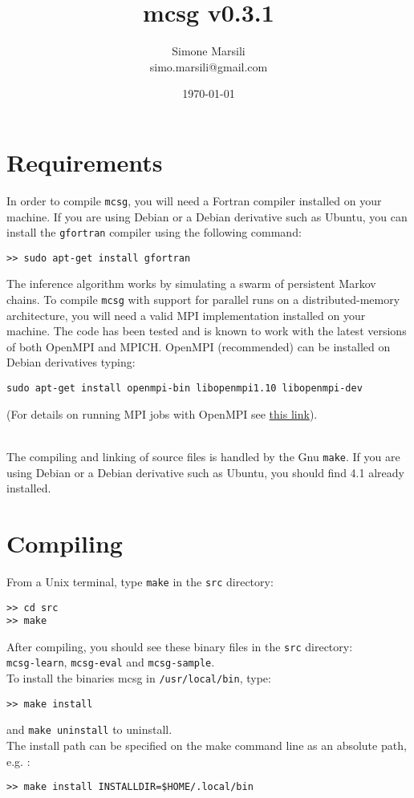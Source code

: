 \documentclass[a4paper,onecolumn]{article}
\title{mcsg v0.3.1}
\author{
        Simone Marsili \\
        simo.marsili@gmail.com
}
\date{\today}
\begin{document}
\maketitle

\section{Requirements}
\label{sec:requirements}

In order to compile \verb|mcsg|, you will need a Fortran compiler installed on your machine.   
If you are using Debian or a Debian derivative such as Ubuntu, you can install the \verb|gfortran| compiler using the following command:
\begin{verbatim}
>> sudo apt-get install gfortran
\end{verbatim}

The inference algorithm works by simulating a swarm of persistent Markov chains. 
To compile \verb|mcsg| with support for parallel runs on a distributed-memory architecture,
you will need a valid MPI implementation installed on your machine. 
The code has been tested and is known to work with the latest versions of both OpenMPI and MPICH.   
OpenMPI (recommended) can be installed on Debian derivatives typing:
\begin{verbatim}
sudo apt-get install openmpi-bin libopenmpi1.10 libopenmpi-dev
\end{verbatim}
(For details on running MPI jobs with OpenMPI see \href{https://www.open-mpi.org/faq/?category=running}{this link}).
\\\

The compiling and linking of source files is handled by the Gnu \verb|make|. 
If you are using Debian or a Debian derivative such as Ubuntu, you should find 4.1 already installed.

\section{Compiling}
\label{sec:compiling}
From a Unix terminal, type \verb|make| in the \verb|src| directory:
\begin{verbatim}
>> cd src
>> make
\end{verbatim}
After compiling, you should see these binary files in the \verb|src| directory:\\
\verb|mcsg-learn|, \verb|mcsg-eval| and \verb|mcsg-sample|. \\
To install the binaries mcsg in \verb|/usr/local/bin|, type:
\begin{verbatim}
>> make install
\end{verbatim}
and \verb|make uninstall| to uninstall.\\
The install path can be specified on the make command line as an absolute path,
e.g. :
\begin{verbatim}
>> make install INSTALLDIR=$HOME/.local/bin
\end{verbatim}
\end{document}

